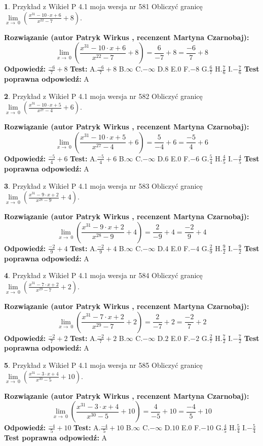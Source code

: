 \documentclass[12pt, a4paper]{article}
\theoremstyle{definition} %
\newtheorem{zad}{}
\newcommand{\zadStart}[1]{\begin{zad}#1\newline}
\newcommand{\zadStop}{\end{zad}}
\newcommand{\rozwStart}[2]{\noindent \textbf{Rozwiązanie (autor #1 , recenzent #2): }\newline}
\newcommand{\rozwStop}{\newline}
\newcommand{\odpStart}{\noindent \textbf{Odpowiedź:}\newline}
\newcommand{\odpStop}{\newline}
\newcommand{\testStart}{\noindent \textbf{Test:}\newline}
\newcommand{\testStop}{\newline}
\newcommand{\kluczStart}{\noindent \textbf{Test poprawna odpowiedź:}\newline}
\newcommand{\kluczStop}{\newline}
\begin{document}
\zadStart{Przykład z Wikieł P 4.1 moja wersja nr 581}
Obliczyć granicę $\lim\limits_{x\to\ 0}(\frac{x^{31}-10 \cdot x +6}{x^{22}-7}+8)$.
\zadStop
\rozwStart{Patryk Wirkus}{Martyna Czarnobaj}
$$\lim\limits_{x\to\ 0}(\frac{x^{31}-10 \cdot x +6}{x^{22}-7}+8)=\frac{6}{-7}+8=\frac{-6}{7}+8$$
\rozwStop
\odpStart
$\frac{-6}{7}+8$
\odpStop
\testStart
A.$\frac{-6}{7}+8$
B.$\infty$
C.$-\infty$
D.$8$
E.$0$
F.$-8$
G.$\frac{6}{7}$
H.$\frac{7}{6}$
I.$-\frac{7}{6}$
\testStop
\kluczStart
A
\kluczStop



\zadStart{Przykład z Wikieł P 4.1 moja wersja nr 582}
Obliczyć granicę $\lim\limits_{x\to\ 0}(\frac{x^{31}-10 \cdot x +5}{x^{27}-4}+6)$.
\zadStop
\rozwStart{Patryk Wirkus}{Martyna Czarnobaj}
$$\lim\limits_{x\to\ 0}(\frac{x^{31}-10 \cdot x +5}{x^{27}-4}+6)=\frac{5}{-4}+6=\frac{-5}{4}+6$$
\rozwStop
\odpStart
$\frac{-5}{4}+6$
\odpStop
\testStart
A.$\frac{-5}{4}+6$
B.$\infty$
C.$-\infty$
D.$6$
E.$0$
F.$-6$
G.$\frac{5}{4}$
H.$\frac{4}{5}$
I.$-\frac{4}{5}$
\testStop
\kluczStart
A
\kluczStop



\zadStart{Przykład z Wikieł P 4.1 moja wersja nr 583}
Obliczyć granicę $\lim\limits_{x\to\ 0}(\frac{x^{31}-9 \cdot x +2}{x^{28}-9}+4)$.
\zadStop
\rozwStart{Patryk Wirkus}{Martyna Czarnobaj}
$$\lim\limits_{x\to\ 0}(\frac{x^{31}-9 \cdot x +2}{x^{28}-9}+4)=\frac{2}{-9}+4=\frac{-2}{9}+4$$
\rozwStop
\odpStart
$\frac{-2}{9}+4$
\odpStop
\testStart
A.$\frac{-2}{9}+4$
B.$\infty$
C.$-\infty$
D.$4$
E.$0$
F.$-4$
G.$\frac{2}{9}$
H.$\frac{9}{2}$
I.$-\frac{9}{2}$
\testStop
\kluczStart
A
\kluczStop



\zadStart{Przykład z Wikieł P 4.1 moja wersja nr 584}
Obliczyć granicę $\lim\limits_{x\to\ 0}(\frac{x^{31}-7 \cdot x +2}{x^{29}-7}+2)$.
\zadStop
\rozwStart{Patryk Wirkus}{Martyna Czarnobaj}
$$\lim\limits_{x\to\ 0}(\frac{x^{31}-7 \cdot x +2}{x^{29}-7}+2)=\frac{2}{-7}+2=\frac{-2}{7}+2$$
\rozwStop
\odpStart
$\frac{-2}{7}+2$
\odpStop
\testStart
A.$\frac{-2}{7}+2$
B.$\infty$
C.$-\infty$
D.$2$
E.$0$
F.$-2$
G.$\frac{2}{7}$
H.$\frac{7}{2}$
I.$-\frac{7}{2}$
\testStop
\kluczStart
A
\kluczStop



\zadStart{Przykład z Wikieł P 4.1 moja wersja nr 585}
Obliczyć granicę $\lim\limits_{x\to\ 0}(\frac{x^{31}-3 \cdot x +4}{x^{30}-5}+10)$.
\zadStop
\rozwStart{Patryk Wirkus}{Martyna Czarnobaj}
$$\lim\limits_{x\to\ 0}(\frac{x^{31}-3 \cdot x +4}{x^{30}-5}+10)=\frac{4}{-5}+10=\frac{-4}{5}+10$$
\rozwStop
\odpStart
$\frac{-4}{5}+10$
\odpStop
\testStart
A.$\frac{-4}{5}+10$
B.$\infty$
C.$-\infty$
D.$10$
E.$0$
F.$-10$
G.$\frac{4}{5}$
H.$\frac{5}{4}$
I.$-\frac{5}{4}$
\testStop
\kluczStart
A
\kluczStop
\end{document}
